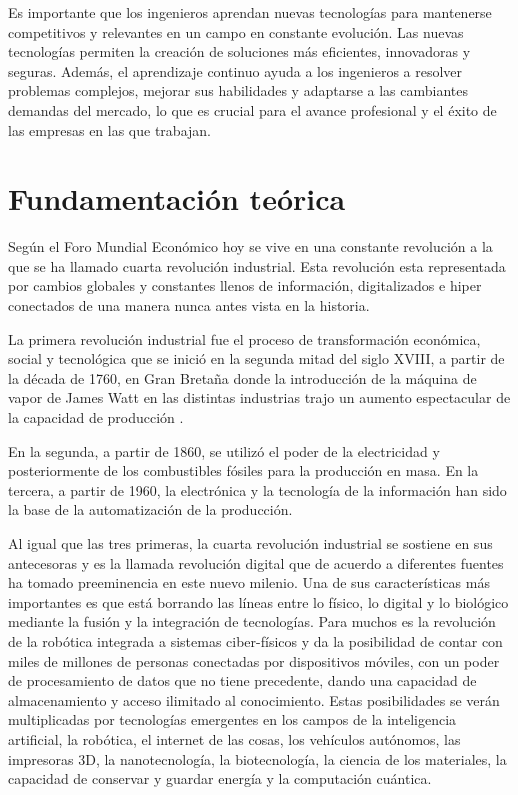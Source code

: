     Es importante que los ingenieros aprendan nuevas tecnologías para mantenerse competitivos y relevantes en un campo en constante evolución. Las nuevas tecnologías permiten la creación de soluciones más eficientes, innovadoras y seguras. Además, el aprendizaje continuo ayuda a los ingenieros a resolver problemas complejos, mejorar sus habilidades y adaptarse a las cambiantes demandas del mercado, lo que es crucial para el avance profesional y el éxito de las empresas en las que trabajan.
    
    \section{Fundamentación teórica}
    
    Según el Foro Mundial Económico hoy se vive en una constante revolución a la que se ha llamado cuarta revolución industrial. Esta revolución esta representada por cambios globales y constantes llenos de información, digitalizados e hiper conectados de una manera nunca antes vista en la historia.
    
    La primera revolución industrial fue el proceso de transformación económica, social y tecnológica que se inició en la segunda mitad del siglo XVIII, a partir de la década de 1760, en Gran Bretaña donde la introducción de la máquina de vapor de James Watt en las distintas industrias trajo un aumento espectacular de la capacidad de producción .
    
    En la segunda, a partir de 1860, se utilizó el poder de la
    electricidad y posteriormente de los combustibles fósiles para la producción en masa. En la tercera, a partir de 1960, la electrónica y la tecnología de la información han sido la base de la automatización de la producción.
    
    Al igual que las tres primeras, la cuarta revolución industrial se sostiene en sus antecesoras y es la llamada revolución digital que de acuerdo a diferentes fuentes ha tomado preeminencia en este nuevo milenio. Una de sus características más importantes es que está borrando las líneas entre lo físico, lo digital y lo biológico mediante la fusión y la integración de tecnologías. Para muchos es la revolución de la robótica integrada a sistemas ciber-físicos y da la posibilidad de contar con miles de millones de personas conectadas por dispositivos móviles, con un poder de procesamiento de datos que no tiene precedente, dando una capacidad de almacenamiento y acceso ilimitado al conocimiento. Estas posibilidades se verán multiplicadas por tecnologías emergentes en los campos de la inteligencia artificial, la robótica, el internet de las cosas, los vehículos autónomos, las impresoras 3D, la nanotecnología, la biotecnología, la ciencia de los materiales, la capacidad de conservar y guardar energía y la computación cuántica.
    
